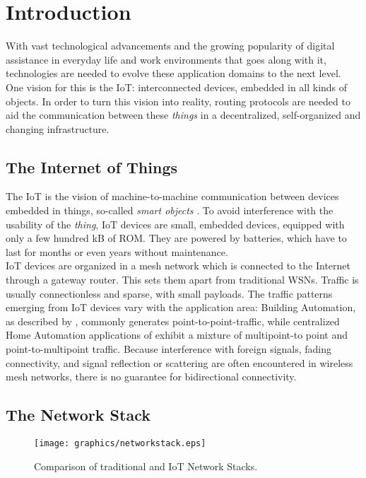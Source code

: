 \section{Introduction}
\label{sec:introduction}
With vast technological advancements and the growing popularity of digital assistance in everyday life and work environments that goes along with it, technologies are needed to evolve these application domains to the next level. One vision for this is the \gls{IoT}: interconnected devices, embedded in all kinds of objects. In order to turn this vision into reality, routing protocols are needed to aid the communication between these \emph{things} in a decentralized, self-organized and changing infrastructure.

\subsection{The Internet of Things}
\label{subsec:intro_IoT}
The \gls{IoT} is the vision of machine-to-machine communication between devices embedded in
things, so-called \emph{smart objects} \cite{KULeuven-314567}.
To avoid interference with the usability of the \emph{thing}, IoT devices are small, embedded devices, equipped with only a few hundred kB of ROM. They are powered by batteries, which have to last for months or even years without maintenance.\\
IoT devices are organized in a mesh network which is connected to the Internet through a gateway router. This sets them apart from traditional \glspl{WSN}.
Traffic is usually connectionless and sparse, with small payloads. The traffic patterns emerging from IoT devices vary with the application area: Building Automation, as described by \cite{RFC5867}, commonly generates point-to-point-traffic, while centralized Home Automation applications of \cite{RFC-5826} exhibit a mixture of multipoint-to point and point-to-multipoint traffic.
Because interference with foreign signals, fading connectivity, and signal reflection or scattering are often encountered in wireless mesh networks, there is no guarantee for bidirectional connectivity.

\subsection{The Network Stack}
\label{subsec:networkstack}
\begin{figure}[ht!]
  \centering
    \texttt{[image: graphics/networkstack.eps]}
  \caption{Comparison of traditional and IoT Network Stacks.}
  \label{fig:networkstack}
\end{figure}

